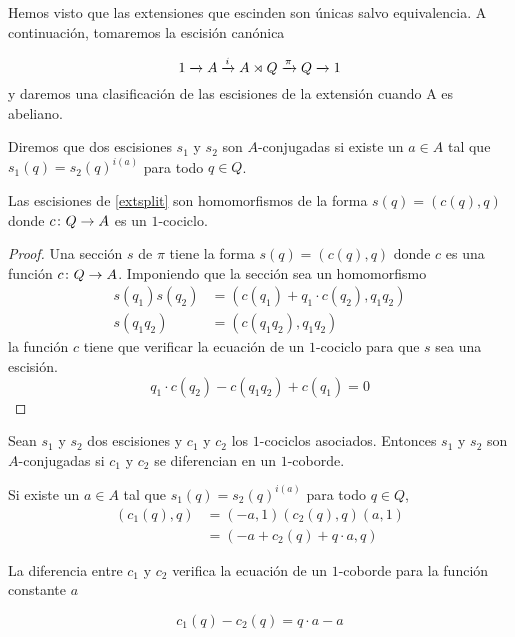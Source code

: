 Hemos visto que las extensiones que escinden son únicas salvo equivalencia. A continuación, tomaremos la escisión canónica

\begin{equation}\label{extsplit}
	\extension i \pi A {A \rtimes Q} Q
\end{equation}
y daremos una clasificación de las escisiones de la extensión cuando A es abeliano. 

\begin{definicion}
	Diremos que dos escisiones $s_1$ y $s_2$ son $A$-conjugadas si existe un $a\in A$ tal que $s_1(q)=s_2(q)^{i(a)}$ para todo $q\in Q$. 
\end{definicion}

\begin{proposicion}\label{prop:coc1}
	Las escisiones de \eqref{extsplit} son homomorfismos de la forma $s(q) = (c(q),q)$ donde $\homo c Q A$ es un $1$-cociclo.
	\begin{proof}
		Una sección $s$ de $\pi$ tiene la forma $s(q) = (c(q),q)$ donde $c$ es una función $\homo c Q A$. Imponiendo que la sección sea un homomorfismo
		\begin{align*}
			s(q_1)s(q_2) &= (c(q_1) + q_1\cdot c(q_2),q_1q_2) \\
			s(q_1q_2) &= (c(q_1q_2),q_1q_2)
		\end{align*}
		la función $c$ tiene que verificar la ecuación de un $1$-cociclo para que $s$ sea una escisión.
		\begin{equation}
			q_1 \cdot c(q_2) - c(q_1q_2) + c(q_1) = 0 
		\end{equation}
	\end{proof}
\end{proposicion}

\begin{proposicion}\label{prop:cob1}
	Sean $s_1$ y $s_2$ dos escisiones y $c_1$ y $c_2$ los $1$-cociclos asociados. Entonces $s_1$ y $s_2$ son $A$-conjugadas si $c_1$ y $c_2$ se diferencian en un $1$-coborde.
	\begin{demostracion}
		Si existe un $a \in A$ tal que $s_1(q) = s_2(q)^{i(a)}$ para todo $q\in Q$, 
		\begin{align*}
		(c_1(q),q) &= (-a,1)(c_2(q),q)(a,1) \\
					&= (-a  + c_2(q) + q\cdot a,q)
		\end{align*}
		
		La diferencia entre $c_1$ y $c_2$ verifica la ecuación de un $1$-coborde para la función constante $a$
		
		\begin{equation}
			c_1(q) - c_2(q) = q\cdot a - a
		\end{equation}
	\end{demostracion}
\end{proposicion}

